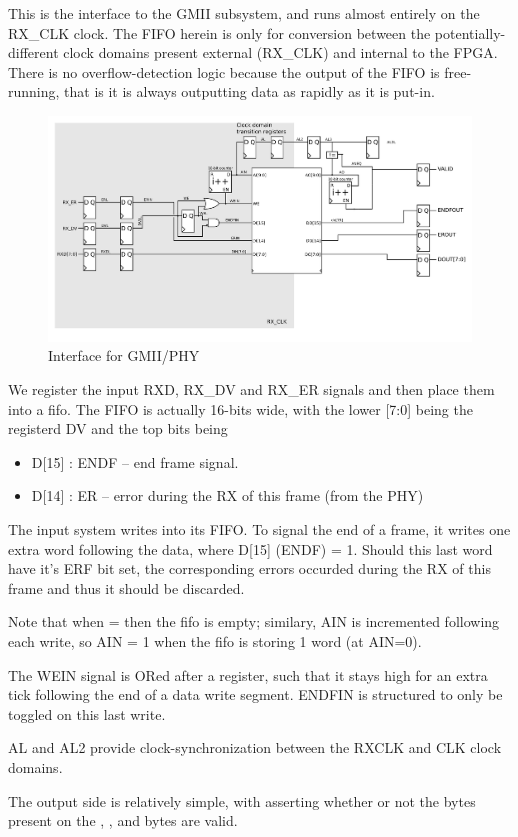 This is the interface to the GMII subsystem, and runs almost entirely
on the RX\_CLK clock. The FIFO herein is only for conversion between
the potentially-different clock domains present external (RX\_CLK) and
internal to the FPGA. There is no overflow-detection logic because the
output of the FIFO is free-running, that is it is always outputting
data as rapidly as it is put-in.

\begin{figure}
\label{gmii}
\includegraphics[scale=0.7]{gmii.svg}
\caption{Interface for GMII/PHY}
\end{figure}

We register the input RXD, RX\_DV and RX\_ER signals and then place them
into a fifo. The FIFO is actually 16-bits wide, with the lower [7:0]
being the registerd DV and the top bits being
\begin{itemize}
\item  D[15] : ENDF -- end frame signal. 
\item  D[14] : ER   -- error during the RX of this frame (from the PHY)
\end{itemize}

The input system writes into its FIFO. To signal the end of a frame,
it writes one extra word following the data, where D[15] (ENDF) =
1. Should this last word have it's ERF bit set, the
corresponding errors occurded during the RX of this frame and thus it
should be discarded.

Note that when  =  then the fifo is empty;
similary, AIN is incremented following each write, so AIN = 1 when the
fifo is storing 1 word (at AIN=0).

The WEIN signal is ORed after a register, such that it stays high for
an extra tick following the end of a data write segment. ENDFIN is
structured to only be toggled on this last write.

AL and AL2 provide clock-synchronization between the RXCLK and CLK
clock domains. 

The output side is relatively simple, with  asserting
whether or not the bytes present on the ,
, and  bytes are valid.

